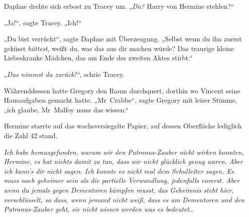 Daphne drehte sich erbost zu Tracey um. „\emph{Du?} Harry von Hermine stehlen?“

„Ja!“, sagte Tracey. „Ich!“

„Du bist verrückt“, sagte Daphne mit Überzeugung. „Selbst wenn du ihn zuerst geküsst \emph{hättest}, weißt du, was das aus dir machen würde? Das traurige kleine Liebeskranke Mädchen, das am Ende des zweiten Aktes stirbt.“

„\emph{Das nimmst du zurück!“,} schrie Tracey.

Währenddessen hatte Gregory den Raum durchquert, dorthin wo Vincent seine Hausaufgaben gemacht hatte. „Mr~Crabbe“, sagte Gregory mit leiser Stimme, „ich glaube, Mr~Malfoy muss das wissen.“


Hermine starrte auf das wachsversiegelte Papier, auf dessen Oberfläche lediglich die Zahl 42 stand.

\emph{Ich habe herausgefunden, warum wir den Patronus-Zauber nicht wirken konnten, Hermine, es hat nichts damit zu tun, dass wir nicht glücklich genug waren. Aber ich kann’s dir nicht sagen. Ich konnte es nicht mal dem Schulleiter sagen. Es muss noch geheimer sein als die partielle Verwandlung, jedenfalls vorerst. Aber wenn du jemals gegen Dementoren kämpfen musst, das Geheimnis steht hier, verschlüsselt, so dass, wenn jemand nicht weiß, dass es um Dementoren und den Patronus-Zauber geht, sie nicht wissen werden was es bedeutet}…

